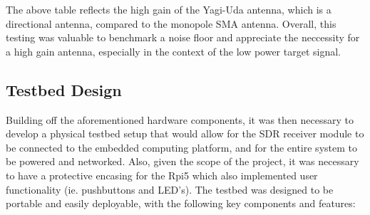 The above table reflects the high gain of the Yagi-Uda antenna, which is a directional antenna, compared to the monopole SMA antenna. Overall, this testing was valuable to benchmark a noise floor and appreciate the neccessity for a high gain antenna, especially in the context of the low power target signal.


\subsection{Testbed Design \label{sec:testbed}}
Building off the aforementioned hardware components, it was then necessary to develop a physical testbed setup that would allow for the SDR receiver module to be connected to the embedded computing platform, and for the entire system to be powered and networked. Also, given the scope of the project, it was necessary to have a protective encasing for the Rpi5 which also implemented user functionality (ie. pushbuttons and LED's). The testbed was designed to be portable and easily deployable, with the following key components and features:


